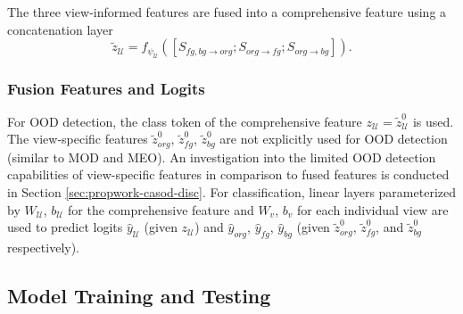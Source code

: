 The three view-informed features are fused into a comprehensive feature using a concatenation layer
\begin{equation}
\tilde{z}_{\mathcal{U}} = f_{\psi_{\mathcal{U}}} ([S_{fg,bg \rightarrow org}; S_{org \rightarrow fg}; S_{org \rightarrow bg}]).
\end{equation}

\subsubsection{Fusion Features and Logits}
For OOD detection, the class token of the comprehensive feature $z_{\mathcal{U}} = \tilde{z}_{\mathcal{U}}^{0}$ is used. The view-specific features $\tilde{z}_{org}^{0}$, $\tilde{z}_{fg}^{0}$, $\tilde{z}_{bg}^{0}$ are not explicitly used for OOD detection (similar to MOD and MEO). An investigation into the limited OOD detection capabilities of view-specific features in comparison to fused features is conducted in Section \ref{sec:propwork-casod-disc}. For classification, linear layers parameterized by $W_{\mathcal{U}}$, $b_{\mathcal{U}}$ for the comprehensive feature and $W_v$, $b_v$ for each individual view are used to predict logits $\hat{y}_{\mathcal{U}}$ (given $z_{\mathcal{U}}$) and $\hat{y}_{org}$, $\hat{y}_{fg}$, $\hat{y}_{bg}$ (given $\tilde{z}_{org}^{0}$, $\tilde{z}_{fg}^{0}$, and $\tilde{z}_{bg}^{0}$ respectively).

\subsection{Model Training and Testing}
\label{sec:casod_method-train}

